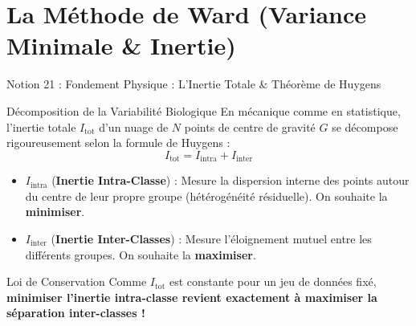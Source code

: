 \documentclass[aspectratio=169,10pt]{beamer}
\begin{document}
\section{La Méthode de Ward (Variance Minimale \& Inertie)}

\begin{frame}{Notion 21 : Fondement Physique : L'Inertie Totale \& Théorème de Huygens}
  \begin{conceptbox}{Décomposition de la Variabilité Biologique}
    \footnotesize
    En mécanique comme en statistique, l'inertie totale $I_{\text{tot}}$ d'un nuage de $N$ points de centre de gravité $G$ se décompose rigoureusement selon la formule de Huygens :
    \begin{equation*}
      I_{\text{tot}} = I_{\text{intra}} + I_{\text{inter}}
    \end{equation*}
    \begin{itemize}
      \item $I_{\text{intra}}$ (\textbf{Inertie Intra-Classe}) : Mesure la dispersion interne des points autour du centre de leur propre groupe (hétérogénéité résiduelle). On souhaite la \textbf{minimiser}.
      \item $I_{\text{inter}}$ (\textbf{Inertie Inter-Classes}) : Mesure l'éloignement mutuel entre les différents groupes. On souhaite la \textbf{maximiser}.
    \end{itemize}
  \end{conceptbox}
  \vspace{1mm}
  \begin{takeawaybox}{Loi de Conservation}
    \footnotesize
    Comme $I_{\text{tot}}$ est constante pour un jeu de données fixé, \textbf{minimiser l'inertie intra-classe revient exactement à maximiser la séparation inter-classes !}
  \end{takeawaybox}
\end{frame}
\end{document}
